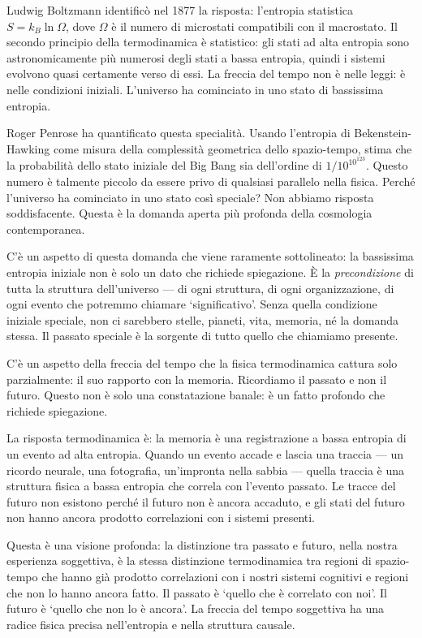 \documentclass[12pt,a4paper,openany]{book}
\newcommand{\sezione}[1]{\vspace{1.2em}{\large\bfseries #1}\vspace{0.5em}\par}
\begin{document}
Ludwig Boltzmann identificò nel 1877 la risposta: l'entropia statistica $S = k_B \ln\Omega$, dove $\Omega$ è il numero di microstati compatibili con il macrostato. Il secondo principio della termodinamica è statistico: gli stati ad alta entropia sono astronomicamente più numerosi degli stati a bassa entropia, quindi i sistemi evolvono quasi certamente verso di essi. La freccia del tempo non è nelle leggi: è nelle condizioni iniziali. L'universo ha cominciato in uno stato di bassissima entropia.

Roger Penrose ha quantificato questa specialità. Usando l'entropia di Bekenstein-Hawking come misura della complessità geometrica dello spazio-tempo, stima che la probabilità dello stato iniziale del Big Bang sia dell'ordine di $1/10^{10^{123}}$. Questo numero è talmente piccolo da essere privo di qualsiasi parallelo nella fisica. Perché l'universo ha cominciato in uno stato così speciale? Non abbiamo risposta soddisfacente. Questa è la domanda aperta più profonda della cosmologia contemporanea.

C'è un aspetto di questa domanda che viene raramente sottolineato: la bassissima entropia iniziale non è solo un dato che richiede spiegazione. È la \textit{precondizione} di tutta la struttura dell'universo --- di ogni struttura, di ogni organizzazione, di ogni evento che potremmo chiamare `significativo'. Senza quella condizione iniziale speciale, non ci sarebbero stelle, pianeti, vita, memoria, né la domanda stessa. Il passato speciale è la sorgente di tutto quello che chiamiamo presente.

\sezione{Il tempo e la memoria: la freccia cognitiva}

C'è un aspetto della freccia del tempo che la fisica termodinamica cattura solo parzialmente: il suo rapporto con la memoria. Ricordiamo il passato e non il futuro. Questo non è solo una constatazione banale: è un fatto profondo che richiede spiegazione.

La risposta termodinamica è: la memoria è una registrazione a bassa entropia di un evento ad alta entropia. Quando un evento accade e lascia una traccia --- un ricordo neurale, una fotografia, un'impronta nella sabbia --- quella traccia è una struttura fisica a bassa entropia che correla con l'evento passato. Le tracce del futuro non esistono perché il futuro non è ancora accaduto, e gli stati del futuro non hanno ancora prodotto correlazioni con i sistemi presenti.

Questa è una visione profonda: la distinzione tra passato e futuro, nella nostra esperienza soggettiva, è la stessa distinzione termodinamica tra regioni di spazio-tempo che hanno già prodotto correlazioni con i nostri sistemi cognitivi e regioni che non lo hanno ancora fatto. Il passato è `quello che è correlato con noi'. Il futuro è `quello che non lo è ancora'. La freccia del tempo soggettiva ha una radice fisica precisa nell'entropia e nella struttura causale.
\end{document}
